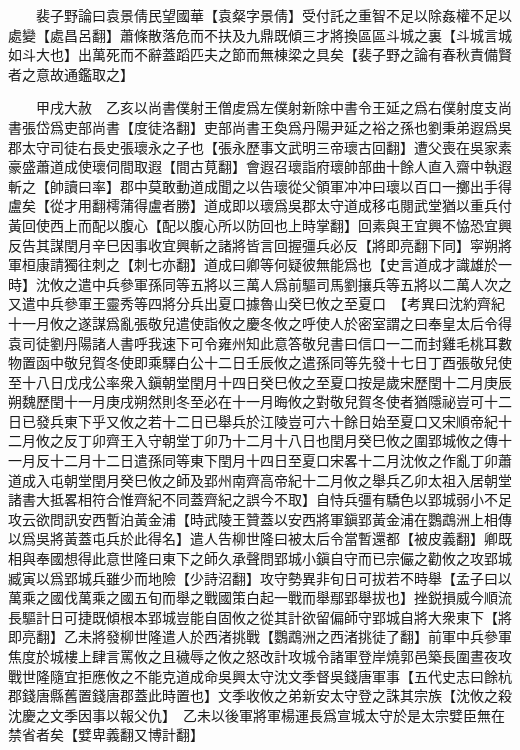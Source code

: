　　裴子野論曰袁景倩民望國華【袁粲字景倩】受付託之重智不足以除姦權不足以處變【處昌呂翻】蕭條散落危而不扶及九鼎既傾三才將換區區斗城之裏【斗城言城如斗大也】出萬死而不辭蓋蹈匹夫之節而無棟梁之具矣【裴子野之論有春秋責備賢者之意故通鑑取之】

　　甲戌大赦　乙亥以尚書僕射王僧䖍爲左僕射新除中書令王延之爲右僕射度支尚書張岱爲吏部尚書【度徒洛翻】吏部尚書王奐爲丹陽尹延之裕之孫也劉秉弟遐爲吳郡太守司徒右長史張瓌永之子也【張永歷事文武明三帝瓌古回翻】遭父喪在吳家素豪盛蕭道成使瓌伺間取遐【間古莧翻】會遐召瓌詣府瓌帥部曲十餘人直入齋中執遐斬之【帥讀曰率】郡中莫敢動道成聞之以告瓌從父領軍冲冲曰瓌以百口一擲出手得盧矣【從才用翻樗蒲得盧者勝】道成即以瓌爲吳郡太守道成移屯閱武堂猶以重兵付黃回使西上而配以腹心【配以腹心所以防回也上時掌翻】回素與王宜興不恊恐宜興反告其謀閏月辛巳因事收宜興斬之諸將皆言回握彊兵必反【將即亮翻下同】寜朔將軍桓康請獨往刺之【刺七亦翻】道成曰卿等何疑彼無能爲也【史言道成才識雄於一時】沈攸之遣中兵參軍孫同等五將以三萬人爲前驅司馬劉攘兵等五將以二萬人次之又遣中兵參軍王靈秀等四將分兵出夏口據魯山癸巳攸之至夏口　【考異曰沈約齊紀十一月攸之遂謀爲亂張敬兒遣使詣攸之慶冬攸之呼使人於密室謂之曰奉皇太后令得袁司徒劉丹陽諸人書呼我速下可令雍州知此意答敬兒書曰信口一二而封雞毛桃耳數物置函中敬兒賀冬使即乘驛白公十二日壬辰攸之遣孫同等先發十七日丁酉張敬兒使至十八日戊戌公率衆入鎭朝堂閏月十四日癸巳攸之至夏口按是歲宋歷閏十二月庚辰朔魏歷閏十一月庚戌朔然則冬至必在十一月晦攸之對敬兒賀冬使者猶隱祕豈可十二日已發兵東下乎又攸之若十二日已舉兵於江陵豈可六十餘日始至夏口又宋順帝紀十二月攸之反丁卯齊王入守朝堂丁卯乃十二月十八日也閏月癸巳攸之圍郢城攸之傳十一月反十二月十二日遣孫同等東下閏月十四日至夏口宋畧十二月沈攸之作亂丁卯蕭道成入屯朝堂閏月癸巳攸之師及郢州南齊高帝紀十二月攸之舉兵乙卯太祖入居朝堂諸書大抵畧相符合惟齊紀不同蓋齊紀之誤今不取】自恃兵彊有驕色以郢城弱小不足攻云欲問訊安西暫泊黃金浦【時武陵王贊蓋以安西將軍鎭郢黃金浦在鸚鵡洲上相傳以爲吳將黃蓋屯兵於此得名】遣人告柳世隆曰被太后令當暫還都【被皮義翻】卿既相與奉國想得此意世隆曰東下之師久承聲問郢城小鎭自守而已宗儼之勸攸之攻郢城臧寅以爲郢城兵雖少而地險【少詩沼翻】攻守勢異非旬日可拔若不時舉【孟子曰以萬乘之國伐萬乘之國五旬而舉之戰國策白起一戰而舉鄢郢舉拔也】挫鋭損威今順流長驅計日可捷既傾根本郢城豈能自固攸之從其計欲留偏師守郢城自將大衆東下【將即亮翻】乙未將發柳世隆遣人於西渚挑戰【鸚鵡洲之西渚挑徒了翻】前軍中兵參軍焦度於城樓上肆言罵攸之且穢辱之攸之怒改計攻城令諸軍登岸燒郭邑築長圍晝夜攻戰世隆隨宜拒應攸之不能克道成命吳興太守沈文季督吳錢唐軍事【五代史志曰餘杭郡錢唐縣舊置錢唐郡蓋此時置也】文季收攸之弟新安太守登之誅其宗族【沈攸之殺沈慶之文季因事以報父仇】　乙未以後軍將軍楊運長爲宣城太守於是太宗嬖臣無在禁省者矣【嬖卑義翻又博計翻】

